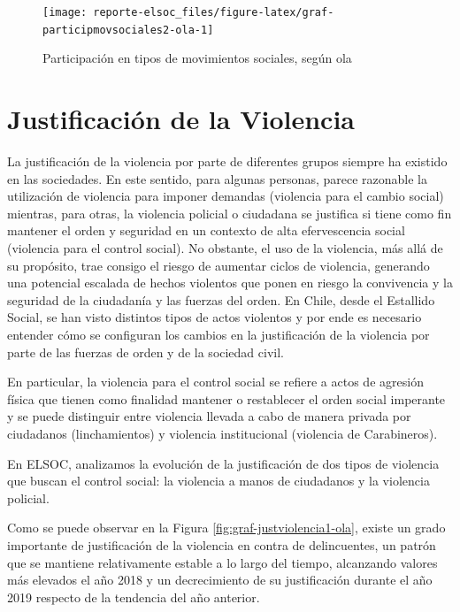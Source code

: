 \documentclass[
  12pt,
]{book}
\begin{document}
\begin{figure}

{\centering \texttt{[image: reporte-elsoc\_files/figure-latex/graf-participmovsociales2-ola-1]} 

}

\caption{Participación en tipos de movimientos sociales, según ola}\label{fig:graf-participmovsociales2-ola}
\end{figure}

\hypertarget{justificaciuxf3n-de-la-violencia}{%
\section{Justificación de la Violencia}\label{justificaciuxf3n-de-la-violencia}}

La justificación de la violencia por parte de diferentes grupos siempre ha existido en las sociedades. En este sentido, para algunas personas, parece razonable la utilización de violencia para imponer demandas (violencia para el cambio social) mientras, para otras, la violencia policial o ciudadana se justifica si tiene como fin mantener el orden y seguridad en un contexto de alta efervescencia social (violencia para el control social). No obstante, el uso de la violencia, más allá de su propósito, trae consigo el riesgo de aumentar ciclos de violencia, generando una potencial escalada de hechos violentos que ponen en riesgo la convivencia y la seguridad de la ciudadanía y las fuerzas del orden. En Chile, desde el Estallido Social, se han visto distintos tipos de actos violentos y por ende es necesario entender cómo se configuran los cambios en la justificación de la violencia por parte de las fuerzas de orden y de la sociedad civil.

En particular, la violencia para el control social se refiere a actos de agresión física que tienen como finalidad mantener o restablecer el orden social imperante y se puede distinguir entre violencia llevada a cabo de manera privada por ciudadanos (linchamientos) y violencia institucional (violencia de Carabineros).

En ELSOC, analizamos la evolución de la justificación de dos tipos de violencia que buscan el control social: la violencia a manos de ciudadanos y la violencia policial.

Como se puede observar en la Figura \ref{fig:graf-justviolencia1-ola}, existe un grado importante de justificación de la violencia en contra de delincuentes, un patrón que se mantiene relativamente estable a lo largo del tiempo, alcanzando valores más elevados el año 2018 y un decrecimiento de su justificación durante el año 2019 respecto de la tendencia del año anterior.
\end{document}
